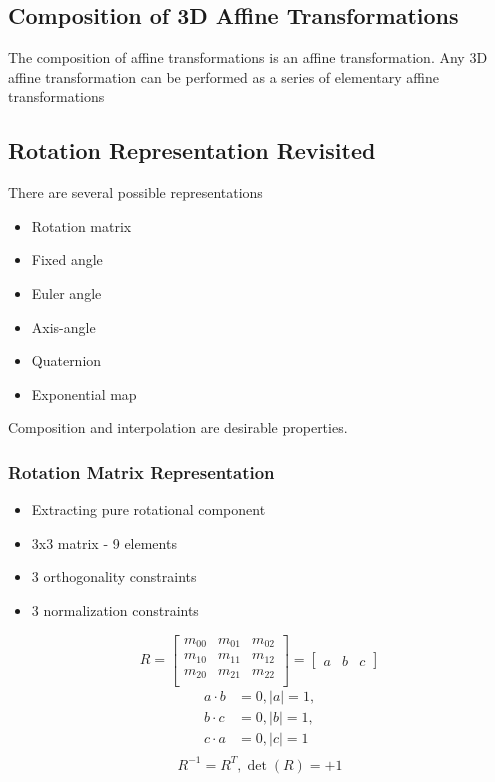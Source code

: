 \documentclass{article}
\begin{document}
\subsection*{Composition of 3D Affine Transformations}
The composition of affine transformations is an affine transformation.
Any 3D affine transformation can be performed as a series of elementary affine transformations

\subsection*{Rotation Representation Revisited}
There are several possible representations
\begin{itemize}
    \item Rotation matrix
    \item Fixed angle
    \item Euler angle
    \item Axis-angle
    \item Quaternion
    \item Exponential map
\end{itemize}
Composition and interpolation are desirable properties.

\subsubsection*{Rotation Matrix Representation}
\begin{itemize}
\item Extracting pure rotational component
\item 3x3 matrix - 9 elements
\item 3 orthogonality constraints
\item 3 normalization constraints
\end{itemize}

\[R = \begin{bmatrix}
    m_{00} & m_{01} & m_{02} \\
    m_{10} & m_{11} & m_{12} \\
    m_{20} & m_{21} & m_{22} \\
\end{bmatrix} = \begin{bmatrix}a & b & c\end{bmatrix}\]
\begin{align*}
a \cdot b &= 0, \vert a \vert = 1,\\
b \cdot c &= 0, \vert b \vert = 1,\\
c \cdot a &= 0, \vert c \vert = 1\\
\end{align*}
\[R^{-1} = R^T, \det(R) = +1\]
\end{document}
